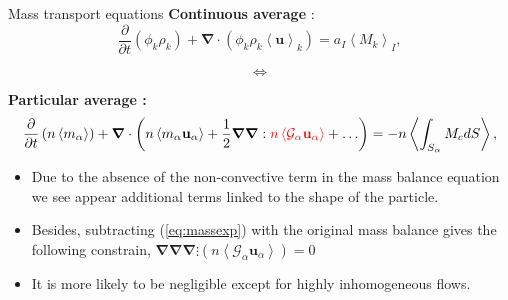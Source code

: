 \documentclass{sintefbeamer}
\newcommand{\kavg}[1]{\left<#1\right>_k}
\newcommand{\Iavg}[1]{\left<#1\right>_I}
\newcommand{\pavg}[1]{n \left<#1\right>}
\newcommand{\nablab}{\bm{\nabla}}
\newcommand{\pddt}{\frac{\partial}{\partial t}}
\begin{document}
\begin{frame}
  {Mass transport equations}
  \textbf{Continuous average} :
  \begin{equation}
    \pddt (\phi_k \rho_k)
    + \nablab \cdot \left(\phi_k \rho_k 
        \kavg{\textbf{u}}
    \right) 
    = a_I\Iavg{M_k},
\end{equation}

  \begin{center}
    \begin{equation*}
      \Longleftrightarrow 
    \end{equation*}
  \end{center}
  \textbf{Particular average :}
  \begin{equation}
    \pddt   \left(\pavg{m_\alpha}\right)
    + \nablab \cdot \left(\pavg{m_\alpha \textbf{u}_\alpha} 
    + \frac{1}{2}\nablab\nablab : 
    \textcolor{red}{\pavg{ \mathcal{G}_\alpha\textbf{u}_\alpha}}
    + \ldots
    \right) 
    = -\pavg{\int_{S_\alpha} M_c d S},
    \label{eq:massexp}
\end{equation}

\begin{itemize}
  \item Due to the absence of the non-convective term in the mass balance equation we see appear additional terms linked to the shape of the particle. 
  \item Besides, subtracting (\ref{eq:massexp}) with the original mass balance gives the following constrain, $\nablab\nablab\nablab \vdots \left(\pavg{ \mathcal{G}_\alpha\textbf{u}_\alpha}\right) = 0$
  \item It is more likely to be negligible except for highly inhomogeneous flows. 
\end{itemize}
\end{frame}
\end{document}

